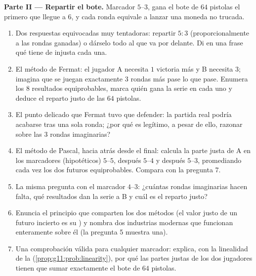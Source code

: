 \begin{problem}
\medskip
\noindent\textbf{Parte II --- Repartir el bote.}
Marcador $5$--$3$, gana el bote de $64$ pistolas el primero que llegue a
$6$, y cada ronda equivale a lanzar una moneda no trucada.
\begin{enumerate}[resume]
  \item Dos respuestas equivocadas muy tentadoras: repartir $5 : 3$
        (proporcionalmente a las rondas ganadas) o dárselo todo al que va
        por delante. Di en una frase qué tiene de injusta cada una.
  \item El método de Fermat: el jugador A necesita $1$ victoria más y B
        necesita $3$; imagina que se juegan exactamente $3$ rondas más
        pase lo que pase. Enumera los $8$ resultados equiprobables, marca
        quién gana la serie en cada uno y deduce el reparto justo de las
        $64$ pistolas.
  \item El punto delicado que Fermat tuvo que defender: la partida real
        podría acabarse tras una sola ronda; ¿por qué es legítimo, a pesar
        de ello, razonar sobre las $3$ rondas imaginarias?
  \item El método de Pascal, hacia atrás desde el final: calcula la parte
        justa de A en los marcadores (hipotéticos) $5$--$5$, después
        $5$--$4$ y después $5$--$3$, promediando cada vez los dos futuros
        equiprobables. Compara con la pregunta 7.
  \item La misma pregunta con el marcador $4$--$3$: ¿cuántas rondas
        imaginarias hacen falta, qué resultados dan la serie a B y cuál es
        el reparto justo?
  \item Enuncia el principio que comparten los dos métodos (el valor justo
        de un futuro incierto es su \emph{}) y nombra dos
        industrias modernas que funcionan enteramente sobre él (la
        pregunta 5 muestra una).
  \item Una comprobación válida para cualquier marcador: explica, con la
        linealidad de la  (\cref{prop:g11:prob:linearity}), por
        qué las partes justas de los dos jugadores tienen que sumar
        exactamente el bote de $64$ pistolas.
\end{enumerate}


\end{problem}
